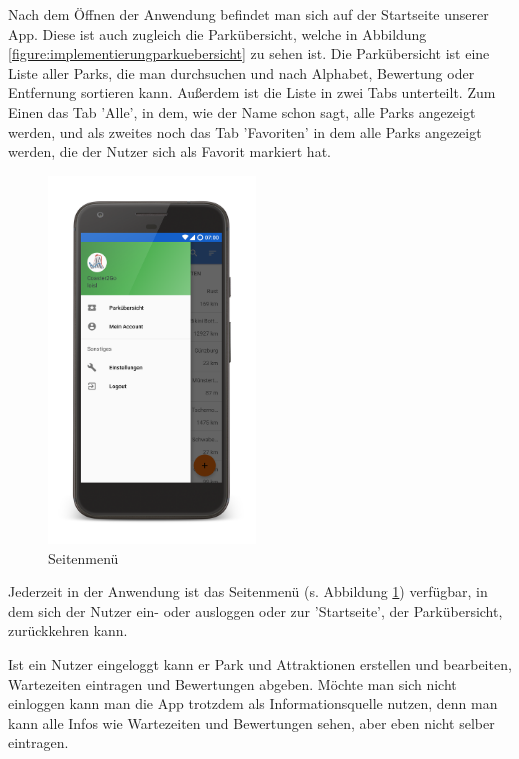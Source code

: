 Nach dem Öffnen der Anwendung befindet man sich auf der Startseite unserer App. Diese ist auch zugleich die Parkübersicht, welche in Abbildung \ref{figure:implementierungparkuebersicht} zu sehen ist. Die Parkübersicht ist eine Liste aller Parks, die man durchsuchen und nach Alphabet, Bewertung oder Entfernung sortieren kann. Außerdem ist die Liste in zwei Tabs unterteilt. Zum Einen das Tab 'Alle', in dem, wie der Name schon sagt, alle Parks angezeigt werden, und als zweites noch das Tab 'Favoriten' in dem alle Parks angezeigt werden, die der Nutzer sich als Favorit markiert hat. 

\begin{figure}[h]
    \centering
    \begin{minipage}{0.49\textwidth}
        \centering
        \includegraphics[width=0.49\textwidth, trim=150 200 200 200, 
        clip]{img/screenshots/ss_sidebar_menu.png}
        \caption{Seitenmenü}
		\label{figure:implementierungsidebar}
    \end{minipage}
\end{figure}

Jederzeit in der Anwendung ist das Seitenmenü (s. Abbildung \ref{figure:implementierungsidebar}) verfügbar, in dem sich der Nutzer ein- oder ausloggen oder zur 'Startseite', der Parkübersicht, zurückkehren kann.

Ist ein Nutzer eingeloggt kann er Park und Attraktionen erstellen und bearbeiten, Wartezeiten eintragen und Bewertungen abgeben. Möchte man sich nicht einloggen kann man die App trotzdem als Informationsquelle nutzen, denn man kann alle Infos wie Wartezeiten und Bewertungen sehen, aber eben nicht selber eintragen. 


